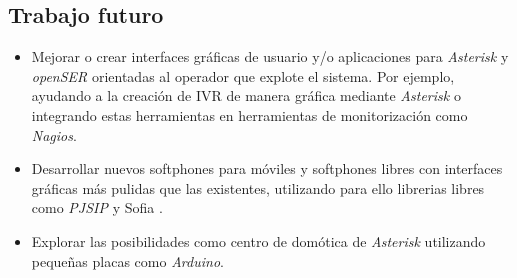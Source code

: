 \documentclass{scrartcl}
\begin{document}
\subsection*{Trabajo futuro}

\begin{itemize}
\item Mejorar o crear interfaces gráficas de usuario y/o aplicaciones para \emph{Asterisk} y \emph{openSER} orientadas al operador que explote el sistema. Por ejemplo, ayudando a la creación de IVR de manera gráfica mediante \emph{Asterisk} o integrando estas herramientas en herramientas de monitorización como \emph{Nagios}.
\item Desarrollar nuevos softphones para móviles y softphones libres con interfaces gráficas más pulidas que las existentes, utilizando para ello librerias libres como \emph{PJSIP} \cite{devel-pjsip} y Sofia \cite{devel-sofia}.
\item Explorar las posibilidades como centro de domótica de \emph{Asterisk} utilizando pequeñas placas como \emph{Arduino}.
\end{itemize}



\end{document}
